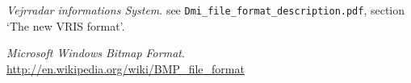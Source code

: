 \renewcommand\bibname{References}

\begin{thebibliography}{10}
\emph{Vejrradar informations System}.
see \texttt{Dmi\_file\_format\_description.pdf}, section `The new VRIS format'.

\emph{Microsoft Windows Bitmap Format}.
\url{http://en.wikipedia.org/wiki/BMP_file_format}
\end{thebibliography}
